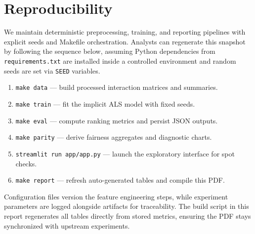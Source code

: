 \section{Reproducibility}
We maintain deterministic preprocessing, training, and reporting pipelines with explicit seeds and Makefile orchestration. Analysts can regenerate this snapshot by following the sequence below, assuming Python dependencies from \texttt{requirements.txt} are installed inside a controlled environment and random seeds are set via \texttt{SEED} variables.
\begin{enumerate}[leftmargin=*,label=\arabic*.]
    \item \texttt{make data} --- build processed interaction matrices and summaries.
    \item \texttt{make train} --- fit the implicit ALS model with fixed seeds.
    \item \texttt{make eval} --- compute ranking metrics and persist JSON outputs.
    \item \texttt{make parity} --- derive fairness aggregates and diagnostic charts.
    \item \texttt{streamlit run app/app.py} --- launch the exploratory interface for spot checks.
    \item \texttt{make report} --- refresh auto-generated tables and compile this PDF.
\end{enumerate}
Configuration files version the feature engineering steps, while experiment parameters are logged alongside artifacts for traceability. The build script in this report regenerates all tables directly from stored metrics, ensuring the PDF stays synchronized with upstream experiments.
